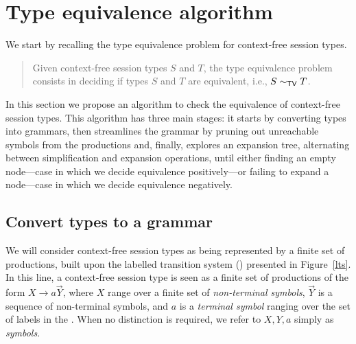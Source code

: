 \section{Type equivalence algorithm}
\label{sec:algorithm}

We start by recalling the type equivalence problem for context-free 
session types.

\begin{quote}
  Given context-free session types $S$ and $T$, the type equivalence
  problem consists in deciding if types $S$ and $T$ are equivalent,
  i.e., $S \sim_{\mathsf{TV}} T$.
\end{quote}

In this section we propose an algorithm to check the equivalence of 
context-free session types. This algorithm has three main stages: 
it starts by converting types into grammars, then streamlines the grammar
by pruning out unreachable symbols from the productions and, finally, 
explores an expansion tree, alternating 
between simplification and expansion operations, until either finding 
an empty node---case in which we decide equivalence positively---or 
failing to expand a node---case in which we decide equivalence negatively.

\subsection{Convert types to a grammar}
\label{subsec:typeToGrammar}

We will consider context-free session types as being represented by a 
finite set of productions, built upon the labelled transition system (\LTS)
presented in Figure~\ref{lts}. In this line, a context-free session type 
is seen as a finite set of productions of the form $X\rightarrow a \vec Y$, 
where $X$ range over a finite set of \emph{non-terminal symbols}, $\vec Y$ 
is a sequence of non-terminal symbols, and $a$ is a \emph{terminal symbol}
ranging over the set of labels in the \LTS. When no distinction is required, 
we refer to $X, Y, a$ simply as \emph{symbols}.

